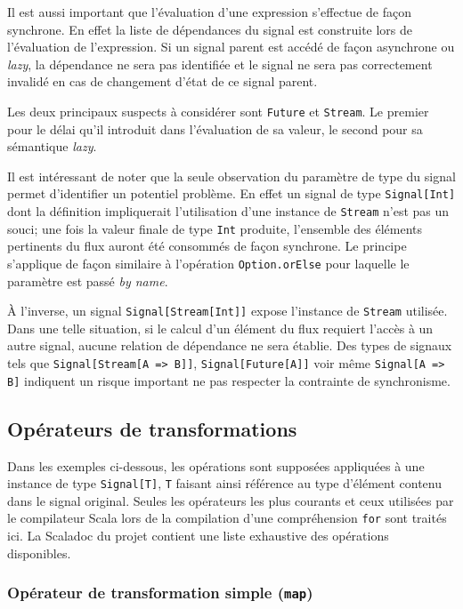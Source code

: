 Il est aussi important que l'évaluation d'une expression s'effectue de façon synchrone. En effet la liste de dépendances du signal est construite lors de l'évaluation de l'expression. Si un signal parent est accédé de façon asynchrone ou \emph{lazy}, la dépendance ne sera pas identifiée et le signal ne sera pas correctement invalidé en cas de changement d'état de ce signal parent.

Les deux principaux suspects à considérer sont \texttt{Future} et \texttt{Stream}. Le premier pour le délai qu'il introduit dans l'évaluation de sa valeur, le second pour sa sémantique \emph{lazy}.

Il est intéressant de noter que la seule observation du paramètre de type du signal permet d'identifier un potentiel problème. En effet un signal de type \texttt{Signal[Int]} dont la définition impliquerait l'utilisation d'une instance de \texttt{Stream} n'est pas un souci; une fois la valeur finale de type \texttt{Int} produite, l'ensemble des éléments pertinents du flux auront été consommés de façon synchrone. Le principe s'applique de façon similaire à l'opération \texttt{Option.orElse} pour laquelle le paramètre est passé \emph{by name}.

À l'inverse, un signal \texttt{Signal[Stream[Int]]} expose l'instance de \texttt{Stream} utilisée. Dans une telle situation, si le calcul d'un élément du flux requiert l'accès à un autre signal, aucune relation de dépendance ne sera établie. Des types de signaux tels que \texttt{Signal[Stream[A => B]]}, \texttt{Signal[Future[A]]} voir même \texttt{Signal[A => B]} indiquent un risque important ne pas respecter la contrainte de synchronisme.

\subsection{Opérateurs de transformations}
Dans les exemples ci-dessous, les opérations sont supposées appliquées à une instance de type \texttt{Signal[T]}, \texttt{T} faisant ainsi référence au type d'élément contenu dans le signal original. Seules les opérateurs les plus courants et ceux utilisées par le compilateur Scala lors de la compilation d'une compréhension \texttt{for} sont traités ici. La Scaladoc du projet contient une liste exhaustive des opérations disponibles.

\subsubsection{Opérateur de transformation simple (\texttt{map})}

